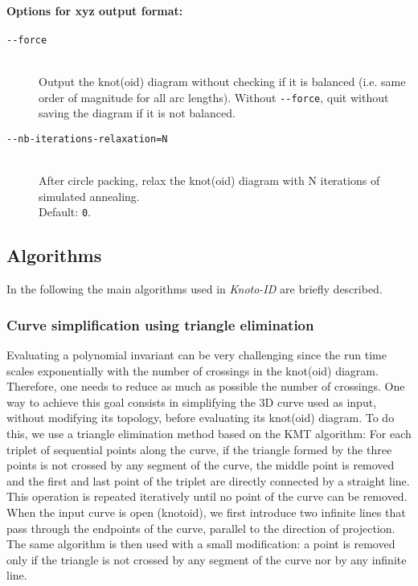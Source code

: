 \paragraph{Options for xyz output format:}
\begin{description}
\item[\lstinline{--force}]\hfill\\
  Output the knot(oid) diagram without checking if it is balanced (i.e. same order of magnitude for all arc lengths).
  Without \lstinline{--force}, quit without saving the diagram if it is not balanced.
\item[\lstinline{--nb-iterations-relaxation=N}]\hfill\\
  After circle packing, relax the knot(oid) diagram with N iterations of simulated annealing.\\
  Default: \lstinline{0}.  
\end{description}


\subsection{\label{sec:algorithms}Algorithms}
In the following the main algorithms used in {\it Knoto-ID} are briefly described.

\subsubsection{\label{sec:algorithms:3dsimplication}Curve simplification using triangle elimination}
Evaluating a polynomial invariant can be very challenging  since the run time scales exponentially with the number of crossings in the knot(oid) diagram. Therefore, one needs to reduce as much as possible the number of crossings. One way to achieve this goal consists in simplifying the 3D curve used as input, without modifying its topology, before evaluating its knot(oid) diagram. To do this, we use a triangle elimination method based on the KMT algorithm\cite{Koniaris1991}\cite{taylor2000}: For each triplet of sequential points along the curve, if the triangle formed by the three points is not crossed by any segment of the curve, the middle point is removed and the first and last point of the triplet are directly connected by a straight line.
This operation is repeated iteratively until no point of the curve can be removed.
When the input curve is open (knotoid), we first introduce two infinite lines that pass through the endpoints of the curve, parallel to the direction of projection. The same algorithm is then used with a small modification: a point is removed only if the triangle is not crossed by any segment of the curve nor by any infinite line.

